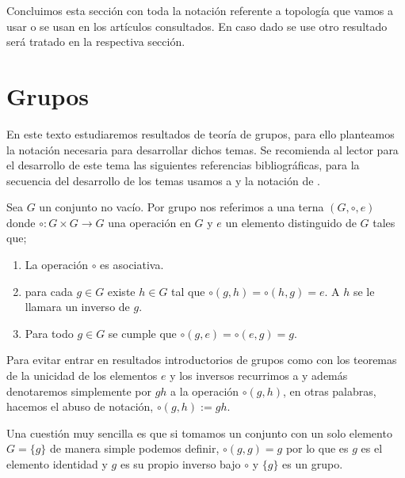 Concluimos esta sección con toda la notación referente a topología que vamos a usar o se usan en los artículos consultados. En caso dado se use otro resultado será tratado en la respectiva sección. 


\section*{Grupos}
En este texto estudiaremos resultados de teoría de grupos, para ello planteamos la notación necesaria para desarrollar dichos temas. Se recomienda al lector para el desarrollo de este tema las siguientes referencias bibliográficas, para la secuencia del desarrollo de los temas usamos a \cite{alg_grove} y la notación de \cite{alg_ii}.

\begin{df}
Sea $G$ un conjunto no vacío. Por grupo nos referimos a una terna $(G, \circ, e)$ donde $\circ:G \times G \to G$ una operación en $G$ y $e$ un elemento distinguido de $G$ tales que;

\begin{enumerate}
	\item La operación $\circ$ es asociativa.
	
	\item para cada $g \in G$ existe $h \in G$ tal que $ \circ (g,h)= \circ(h ,g)=e$. A $h$ se le llamara un inverso de $g$. 
	
	\item Para todo $g \in G$ se cumple que $\circ(g ,e) =  \circ(e,g) = g.$
\end{enumerate}
\end{df}

\begin{cn}
Para evitar entrar en resultados introductorios de grupos como con los teoremas de la unicidad de los elementos $e$ y los inversos recurrimos a \cite{alg_grove} y además  denotaremos simplemente por $gh$ a la operación $\circ(g,h)$, en otras palabras, hacemos el abuso de notación,  $\circ(g,h):=gh.$
\end{cn}

Una cuestión muy sencilla es que si tomamos un conjunto con un solo elemento $G=\{g\}$ de manera simple podemos definir, $\circ(g,g)=g$ por lo que es $g$ es el elemento identidad y $g$ es su propio inverso bajo $\circ$ y $\{g\}$ es un grupo. 

